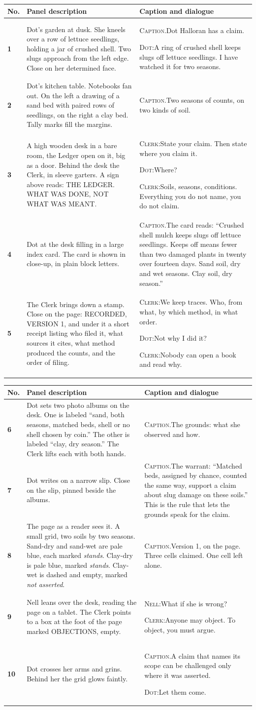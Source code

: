 \documentclass[11pt]{article}
\makeatletter
\newcommand{\nm}[1]{\textsc{#1}}
\newcommand{\cp}[1]{\textsc{Caption.}\enspace #1\par\vspace{2pt}}
\newcommand{\sy}[2]{\nm{#1:}\enspace #2\par\vspace{2pt}}
\newcommand{\fr}[3]{\textbf{#1} & {\small #2} & {\small #3} \\ \midrule}
\newenvironment{sheet}[1]
 {\par\noindent{\footnotesize\textsc{Script page #1 of 8}}\par\vspace{2pt}\noindent
  \begin{tabular}{@{}>{\raggedright\arraybackslash}p{0.28in} >{\raggedright\arraybackslash}p{2.35in} >{\raggedright\arraybackslash}p{3.0in}@{}}\toprule
  \footnotesize No. & \footnotesize Panel description & \footnotesize Caption and dialogue \\ \midrule}
 {\end{tabular}\newpage}
\makeatother
\begin{document}
\newpage

\begin{sheet}{1}
\fr{1}{Dot's garden at dusk. She kneels over a row of lettuce seedlings, holding a jar of crushed shell. Two slugs approach from the left edge. Close on her determined face.}{\cp{Dot Halloran has a claim.}\sy{Dot}{A ring of crushed shell keeps slugs off lettuce seedlings. I have watched it for two seasons.}}
\fr{2}{Dot's kitchen table. Notebooks fan out. On the left a drawing of a sand bed with paired rows of seedlings, on the right a clay bed. Tally marks fill the margins.}{\cp{Two seasons of counts, on two kinds of soil.}}
\fr{3}{A high wooden desk in a bare room, the Ledger open on it, big as a door. Behind the desk the Clerk, in sleeve garters. A sign above reads: THE LEDGER. WHAT WAS DONE, NOT WHAT WAS MEANT.}{\sy{Clerk}{State your claim. Then state where you claim it.}\sy{Dot}{Where?}\sy{Clerk}{Soils, seasons, conditions. Everything you do not name, you do not claim.}}
\fr{4}{Dot at the desk filling in a large index card. The card is shown in close-up, in plain block letters.}{\cp{The card reads: ``Crushed shell mulch keeps slugs off lettuce seedlings. Keeps off means fewer than two damaged plants in twenty over fourteen days. Sand soil, dry and wet seasons. Clay soil, dry season.''}}
\fr{5}{The Clerk brings down a stamp. Close on the page: RECORDED, VERSION 1, and under it a short receipt listing who filed it, what sources it cites, what method produced the counts, and the order of filing.}{\sy{Clerk}{We keep traces. Who, from what, by which method, in what order.}\sy{Dot}{Not why I did it?}\sy{Clerk}{Nobody can open a book and read why.}}
\end{sheet}

\begin{sheet}{2}
\fr{6}{Dot sets two photo albums on the desk. One is labeled ``sand, both seasons, matched beds, shell or no shell chosen by coin.'' The other is labeled ``clay, dry season.'' The Clerk lifts each with both hands.}{\cp{The grounds: what she observed and how.}}
\fr{7}{Dot writes on a narrow slip. Close on the slip, pinned beside the albums.}{\cp{The warrant: ``Matched beds, assigned by chance, counted the same way, support a claim about slug damage on these soils.'' This is the rule that lets the grounds speak for the claim.}}
\fr{8}{The page as a reader sees it. A small grid, two soils by two seasons. Sand-dry and sand-wet are pale blue, each marked \emph{stands}. Clay-dry is pale blue, marked \emph{stands}. Clay-wet is dashed and empty, marked \emph{not asserted}.}{\cp{Version 1, on the page. Three cells claimed. One cell left alone.}}
\fr{9}{Nell leans over the desk, reading the page on a tablet. The Clerk points to a box at the foot of the page marked OBJECTIONS, empty.}{\sy{Nell}{What if she is wrong?}\sy{Clerk}{Anyone may object. To object, you must argue.}}
\fr{10}{Dot crosses her arms and grins. Behind her the grid glows faintly.}{\cp{A claim that names its scope can be challenged only where it was asserted.}\sy{Dot}{Let them come.}}
\end{sheet}
\end{document}
